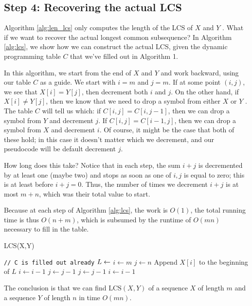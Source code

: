 \documentclass [12pt]{article}
\theoremstyle{definition}
\begin{document}
\subsection{Step 4: Recovering the actual LCS} 
Algorithm \ref{alg:len_lcs} only computes the length of the LCS of $X$ and $Y$ . What if we want to recover the actual longest common subsequence? In Algorithm \ref{alg:lcs}, we show how we can construct the actual LCS, given the dynamic programming table $C$ that we've filled out in Algorithm 1.

In this algorithm, we start from the end of $X$ and $Y$ and work backward, using our table $C$ as a guide. We start with $i = m$ and $j = m$. If at some point $(i, j)$, we see that $X[i] = Y[j]$, then decrement both $i$ and $j$. On the other hand, if $X[i] \neq Y[j]$, then we know that we need to drop a symbol from either $X$ or $Y$ . The table $C$ will tell us which: if $C[i, j] = C[i, j - 1]$, then we can drop a symbol from $Y$ and decrement $j$. If $C[i, j] = C[i - 1, j]$, then we can drop a symbol from $X$ and decrement $i$. Of course, it might be the case that both of these hold; in this case it doesn't matter which we decrement, and our pseudocode will be default decrement $j$. 

How long does this take? Notice that in each step, the sum $i + j$ is decremented by at least one (maybe two) and stops as soon as one of $i, j$ is equal to zero; this is at least before $i + j = 0$. Thus, the number of times we decrement $i + j$ is at most $m + n$, which was their total value to start.

Because at each step of Algorithm \ref{alg:lcs}, the work is $O(1)$, the total running time is thus $O(n+m)$, which is subsumed by the runtime of $O(mn)$ necessary to fill in the table.

\begin{algorithm}
\caption{LCS(X,Y)}
\label{alg:lcs}
\begin{algorithmic}
\STATE \texttt{// C is filled out already}
\STATE $L \gets \empty$
\STATE $i \gets m$
\STATE $j \gets n$
    \STATE Append $X[i]$ to the beginning of $L$
    \STATE $i \gets i -1$
    \STATE $j \gets j -1$
    \STATE $j \gets j - 1$
  \ELSE
    \STATE $i \gets i - 1$
  \ENDIF
\ENDWHILE
\end{algorithmic}
\end{algorithm}

The conclusion is that we can find $\text{LCS}(X, Y )$ of a sequence $X$ of length $m$ and a sequence $Y$ of length $n$ in time $O(mn)$.
\end{document}
